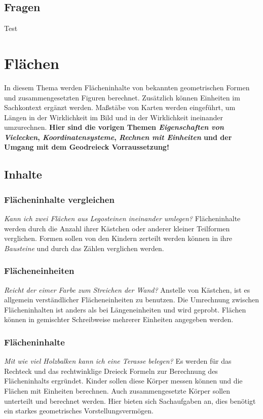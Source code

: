 \documentclass{article}
\begin{document}
\subsection{Fragen}
\begin{tcolorbox}[colback=blue!5!white,colframe=blue!25!black]
Test
\end{tcolorbox}
\newpage
\section{Flächen}
In diesem Thema werden Flächeninhalte von bekannten geometrischen Formen und zusammengesetzten Figuren berechnet. Zusätzlich können Einheiten im Sachkontext ergänzt werden. Maßstäbe von Karten werden eingeführt, um Längen in der Wirklichkeit im Bild und in der Wirklichkeit ineinander umzurechnen.
\textbf{Hier sind die vorigen Themen \textit{Eigenschaften von Vielecken}, \textit{Koordinatensysteme}, \textit{Rechnen mit Einheiten} und der Umgang mit dem Geodreieck Vorraussetzung!}
\subsection{Inhalte}
\subsubsection*{Flächeninhalte vergleichen}
\textit{Kann ich zwei Flächen aus Legosteinen ineinander umlegen?}
Flächeninhalte werden durch die Anzahl ihrer Kästchen oder anderer kleiner Teilformen verglichen. Formen sollen von den Kindern zerteilt werden können in ihre \textit{Bausteine} und durch das Zählen verglichen werden. 
\subsubsection*{Flächeneinheiten}
\textit{Reicht der eimer Farbe zum Streichen der Wand?}
Anstelle von Kästchen, ist es allgemein verständlicher Flächeneinheiten zu benutzen. Die Umrechnung zwischen Flächeninhalten ist anders als bei Längeneinheiten und wird geprobt. Flächen können in gemischter Schreibweise mehrerer Einheiten angegeben werden.
\subsubsection*{Flächeninhalte}
\textit{Mit wie viel Holzbalken kann ich eine Terasse belegen?}
Es werden für das Rechteck und das rechtwinklige Dreieck Formeln zur Berechnung des Flächeninhalts ergründet. Kinder sollen diese Körper messen können und die Flächen mit Einheiten berechnen. Auch zusammengesetzte Körper sollen unterteilt und berechnet werden.
Hier bieten sich Sachaufgaben an, dies benötigt ein starkes geometrisches Vorstellungsvermögen.
\end{document}
